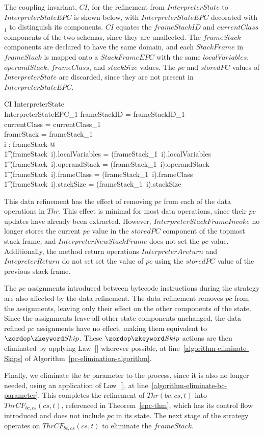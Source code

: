 The coupling invariant, $CI$, for the refinement from
$InterpreterState$ to $InterpreterStateEPC$ is shown below, with
$InterpreterStateEPC$ decorated with ${}_1$ to distinguish its
components.
$CI$ equates the $frameStackID$ and $currentClass$ components of the
two schemas, since they are unaffected.
The $frameStack$ components are declared to have the same domain, and
each $StackFrame$ in $frameStack$ is mapped onto a $StackFrameEPC$
with the same $localVariables$, $operandStack$, $frameClass$, and
$stackSize$ values.
The $pc$ and $storedPC$ values of $InterpreterState$ are discarded,
since they are not present in $InterpreterStateEPC$.
\begin{schema}{CI}
  InterpreterState \\
  InterpreterStateEPC_1
\where
  frameStackID = frameStackID_1 \\
  currentClass = currentClass_1 \\
  \dom frameStack = \dom frameStack_1 \\
  \forall i : \dom frameStack @ \\
  \t1 (frameStack~i).localVariables = (frameStack_1~i).localVariables \land \\
  \t1 (frameStack~i).operandStack = (frameStack_1~i).operandStack \land \\
  \t1 (frameStack~i).frameClass = (frameStack_1~i).frameClass \land \\
  \t1 (frameStack~i).stackSize = (frameStack_1~i).stackSize
\end{schema}

This data refinement has the effect of removing $pc$ from each of the
data operations in $Thr$.
This effect is minimal for most data operations, since their $pc$
updates have already been extracted. 
However, $InterpreterStackFrameInvoke$ no longer stores the current
$pc$ value in the $storedPC$ component of the topmost stack frame, and
$InterpreterNewStackFrame$ does not set the $pc$ value.
Additionally, the method return operations $InterpreterAreturn$ and
$IntepreterReturn$ do not set set the value of $pc$ using the
$storedPC$ value of the previous stack frame.

The $pc$ assignments introduced between bytecode instructions during
the strategy are also affected by the data refinement.
The data refinement removes $pc$ from the assignments, leaving only
their effect on the other components of the state.
Since the assignments leave all other state components unchanged, the
data-refined $pc$ assignments have no effect, making them equivalent
to $\Skip$.
These $\Skip$ actions are then eliminated by applying
Law~[] wherever possible, at
line~\ref{algorithm-eliminate-Skips} of
Algorithm~\ref{pc-elimination-algorithm}.

Finally, we eliminate the $bc$ parameter to the process, since it is
also no longer needed, using an application of
Law~[], at
line~\ref{algorithm-eliminate-bc-parameter}.
This completes the refinement of $Thr(bc,cs,t)$ into
$ThrCF_{bc,cs}(cs,t)$, referenced in
Theorem~\ref{epc-thm}, which has its control flow
introduced and does not include $pc$ in its state.
The next stage of the strategy operates on $ThrCF_{bc,cs}(cs,t)$ to
eliminate the $frameStack$.
